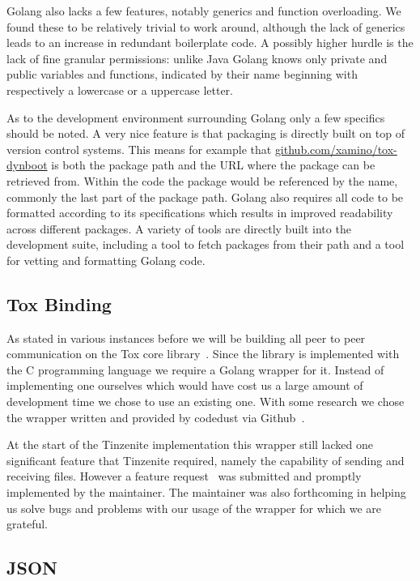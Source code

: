 Golang also lacks a few features, notably generics and function overloading.
We found these to be relatively trivial to work around, although the lack of generics leads to an increase in redundant boilerplate code.
A possibly higher hurdle is the lack of fine granular permissions: unlike Java Golang knows only private and public variables and functions, indicated by their name beginning with respectively a lowercase or a uppercase letter.

As to the development environment surrounding Golang only a few specifics should be noted.
A very nice feature is that packaging is directly built on top of version control systems.
This means for example that \href{https://github.com/xamino/tox-dynboot}{github.com/xamino/tox-dynboot} is both the package path and the URL where the package can be retrieved from.
Within the code the package would be referenced by the name, commonly the last part of the package path.
Golang also requires all code to be formatted according to its specifications which results in improved readability across different packages.
A variety of tools are directly built into the development suite, including a tool to fetch packages from their path and a tool for vetting and formatting Golang code.

\subsection{Tox Binding}
\label{sub:Tox Binding}

As stated in various instances before we will be building all peer to peer communication on the Tox core library~\cite{web:site:github:toxcore}.
Since the library is implemented with the C programming language we require a Golang wrapper for it.
Instead of implementing one ourselves which would have cost us a large amount of development time we chose to use an existing one.
With some research we chose the wrapper written and provided by codedust via Github~\cite{web:site:github:gotox}.

At the start of the Tinzenite implementation this wrapper still lacked one significant feature that Tinzenite required, namely the capability of sending and receiving files.
However a feature request~\cite{web:site:github:file_issue} was submitted and promptly implemented by the maintainer.
The maintainer was also forthcoming in helping us solve bugs and problems with our usage of the wrapper for which we are grateful.

\subsection{JSON}
\label{sub:JSON}

